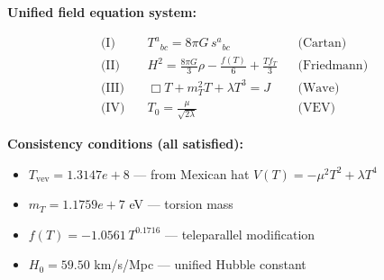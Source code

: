 
\textbf{Unified field equation system:}

\begin{align}
  \text{(I)} \quad & T^a{}_{bc} = 8\pi G \, s^a{}_{bc} && \text{(Cartan)} \\
  \text{(II)} \quad & H^2 = \frac{8\pi G}{3}\rho - \frac{f(T)}{6} + \frac{Tf_T}{3} && \text{(Friedmann)} \\
  \text{(III)} \quad & \Box T + m_T^2 T + \lambda T^3 = J && \text{(Wave)} \\
  \text{(IV)} \quad & T_0 = \frac{\mu}{\sqrt{2\lambda}} && \text{(VEV)}
\end{align}

\textbf{Consistency conditions (all satisfied):}
\begin{itemize}
  \item $T_{\text{vev}} = 1.3147e+8$ — from Mexican hat $V(T) = -\mu^2 T^2 + \lambda T^4$
  \item $m_T = 1.1759e+7$ eV — torsion mass
  \item $f(T) = -1.0561 \, T^{0.1716}$ — teleparallel modification
  \item $H_0 = 59.50$ km/s/Mpc — unified Hubble constant
\end{itemize}